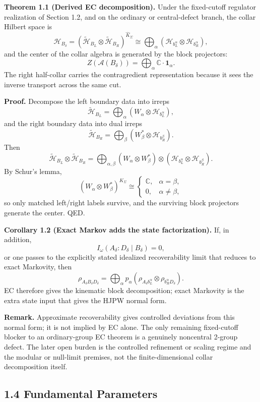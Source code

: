 \textbf{Theorem 1.1 (Derived EC decomposition).} Under the fixed-cutoff regulator realization of Section 1.2, and on the ordinary or central-defect branch, the collar Hilbert space is
\[
\mathcal H_{B_\delta}
=
(\tilde{\mathcal H}_{B_L}\otimes \tilde{\mathcal H}_{B_R})^{\widehat K_\Sigma}
\cong
\bigoplus_{\alpha}
\left(\mathcal H_{b_L^\alpha}\otimes \mathcal H_{b_R^\alpha}\right),
\]
and the center of the collar algebra is generated by the block projectors:
\[
Z(\mathcal A(B_\delta))
=
\bigoplus_\alpha \mathbb C\cdot \mathbf 1_\alpha.
\]
The right half-collar carries the contragredient representation because it sees the inverse transport across the same cut.

\textbf{Proof.} Decompose the left boundary data into irreps
\[
\tilde{\mathcal H}_{B_L}
=
\bigoplus_\alpha
\left(W_\alpha\otimes \mathcal H_{b_L^\alpha}\right),
\]
and the right boundary data into dual irreps
\[
\tilde{\mathcal H}_{B_R}
=
\bigoplus_\beta
\left(W_\beta^*\otimes \mathcal H_{b_R^\beta}\right).
\]
Then
\[
\tilde{\mathcal H}_{B_L}\otimes \tilde{\mathcal H}_{B_R}
=
\bigoplus_{\alpha,\beta}
(W_\alpha\otimes W_\beta^*)\otimes
(\mathcal H_{b_L^\alpha}\otimes \mathcal H_{b_R^\beta}).
\]
By Schur's lemma,
\[
(W_\alpha\otimes W_\beta^*)^{\widehat K_\Sigma}
\cong
\begin{cases}
\mathbb C, & \alpha=\beta,\\
0, & \alpha\neq \beta,
\end{cases}
\]
so only matched left/right labels survive, and the surviving block projectors generate the center. QED.

\textbf{Corollary 1.2 (Exact Markov adds the state factorization).} If, in addition,
\[
I_\omega(A_\delta:D_\delta\mid B_\delta)=0,
\]
or one passes to the explicitly stated idealized recoverability limit that reduces to exact Markovity, then
\[
\rho_{A_\delta B_\delta D_\delta}
=
\bigoplus_\alpha p_\alpha
\left(\rho_{A_\delta b_L^\alpha}\otimes \rho_{b_R^\alpha D_\delta}\right).
\]
EC therefore gives the kinematic block decomposition; exact Markovity is the extra state input that gives the HJPW normal form.

\textbf{Remark.} Approximate recoverability gives controlled deviations from this normal form; it is not implied by EC alone. The only remaining fixed-cutoff blocker to an ordinary-group EC theorem is a genuinely noncentral 2-group defect. The later open burden is the controlled refinement or scaling regime and the modular or null-limit premises, not the finite-dimensional collar decomposition itself.
\subsection{1.4 Fundamental Parameters}\label{14-fundamental-parameters}

